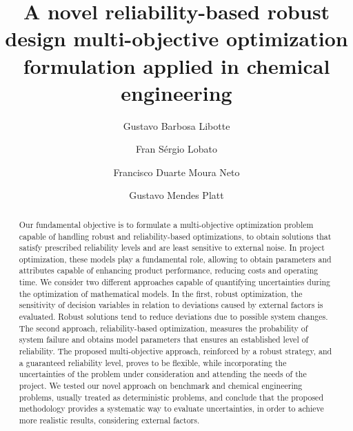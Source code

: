 \documentclass[final,5p,times,twocolumn,numbers]{elsarticle}
\begin{document}
\begin{frontmatter}

\title{A novel reliability-based robust design multi-objective optimization formulation applied in chemical engineering}

\author[1,2]{Gustavo Barbosa Libotte}%
\author[3]{Fran S{\'e}rgio Lobato}
\author[1]{Francisco Duarte Moura Neto}
\author[4]{Gustavo Mendes Platt}

\address[1]{Polytechnic Institute, Rio de Janeiro State University, Nova Friburgo, Brazil}

\address[2]{National Laboratory for Scientific Computing, Petrópolis, Brazil}

\address[3]{Chemical Engineering Faculty, Federal University of Uberl{\^{a}}ndia, Uberl{\^{a}}ndia, Brazil}

\address[4]{School of Chemistry and Food, Federal University of Rio Grande, Santo Ant\^{o}nio da Patrulha, Brazil}

\begin{abstract}
Our fundamental objective is to formulate a multi-objective optimization problem capable of handling robust and reliability-based optimizations, to obtain solutions that satisfy prescribed reliability levels and are least sensitive to external noise. In project optimization, these models play a fundamental role, allowing to obtain parameters and attributes capable of enhancing product performance, reducing costs and operating time. We consider two different approaches capable of quantifying uncertainties during the optimization of mathematical models. In the first, robust optimization, the sensitivity of decision variables in relation to deviations caused by external factors is evaluated. Robust solutions tend to reduce deviations due to possible system changes. The second approach, reliability-based optimization, measures the probability of system failure and obtains model parameters that ensures an established level of reliability. The proposed multi-objective approach, reinforced by a robust strategy, and a guaranteed reliability level, proves to be flexible, while incorporating the uncertainties of the problem under consideration and attending the needs of the project. We tested our novel approach on benchmark and chemical engineering problems, usually treated as deterministic problems, and conclude that the proposed methodology provides a systematic way to evaluate uncertainties, in order to achieve more realistic results, considering external factors.
\end{abstract}


\end{frontmatter}
\end{document}
